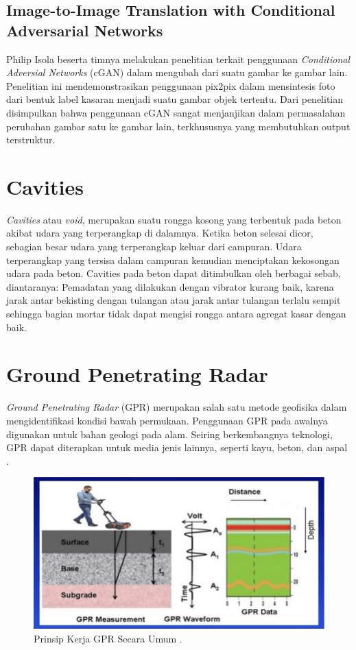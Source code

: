 \subsection{Image-to-Image Translation with Conditional Adversarial Networks}
\label{image2imagetranslationCGAN}
Philip Isola beserta timnya melakukan penelitian terkait penggunaan \emph{Conditional Adversial Networks} (cGAN) dalam mengubah dari suatu gambar ke gambar lain. 
Penelitian ini mendemonstrasikan penggunaan pix2pix dalam mensintesis foto dari bentuk label kasaran menjadi suatu gambar objek tertentu. 
Dari penelitian disimpulkan bahwa penggunaan cGAN sangat menjanjikan dalam permasalahan perubahan gambar satu ke gambar lain, terkhususnya yang membutuhkan output terstruktur. \parencite{image2imageCGAN}

\section{Cavities}
\label{sec:cavities}

\emph{Cavities} atau \emph{void}, merupakan suatu rongga kosong yang terbentuk pada beton akibat udara yang terperangkap di dalamnya. 
Ketika beton selesai dicor, sebagian besar udara yang terperangkap keluar dari campuran. 
Udara terperangkap yang tersisa dalam campuran kemudian menciptakan kekosongan udara pada beton. 
Cavities pada beton dapat ditimbulkan oleh berbagai sebab, diantaranya: Pemadatan yang dilakukan dengan vibrator kurang baik, 
karena jarak antar bekisting dengan tulangan atau jarak antar tulangan terlalu sempit sehingga bagian mortar tidak dapat mengisi rongga antara agregat kasar dengan baik. \parencite{analisakerusakanbeton}

\section{Ground Penetrating Radar}
\label{sec:groundPenetratingRadar}

\emph{Ground Penetrating Radar} (GPR) merupakan salah satu metode geofisika dalam mengidentifikasi kondisi bawah permukaan. 
Penggunaan GPR pada awalnya digunakan untuk bahan geologi pada alam. 
Seiring berkembangnya teknologi, GPR dapat diterapkan untuk media jenis lainnya, seperti kayu, beton, dan aspal \parencite{jol2008ground}.

\begin{figure}[ht]
  \centering
  \includegraphics[scale=0.35]{gambar/prinsipGPR.png}
  \caption{Prinsip Kerja GPR Secara Umum \parencite{gprPrinciple}.}
  \label{fig:prinsipGpr}
\end{figure}

